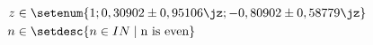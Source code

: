 \begin{align}
  z &\in \setenum{1; 0,30902 \pm 0,95106 \jz ; -0,80902 \pm 0,58779 \jz }\\
  n &\in \setdesc{ n \in IN \mid \text{n is even} }
\end{align}    
